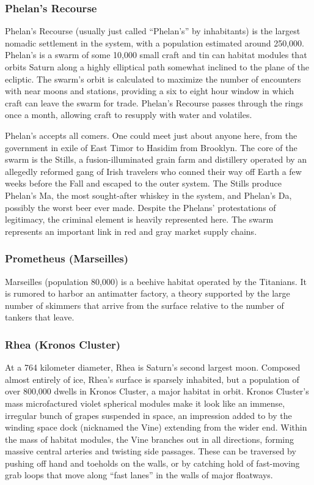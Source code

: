 \subsubsection{Phelan's Recourse}
\label{sec:phelans-recourse} 

Phelan's Recourse (usually just called “Phelan's” by inhabitants) is the largest nomadic settlement in the system, with a population estimated around 250,000. Phelan's is a swarm of some 10,000 small craft and tin can habitat modules that orbits Saturn along a highly elliptical path somewhat inclined to the plane of the ecliptic. The swarm's orbit is calculated to maximize the number of encounters with near moons and stations, providing a six to eight hour window in which craft can leave the swarm for trade. Phelan's Recourse passes through the rings once a month, allowing craft to resupply with water and volatiles. 

Phelan's accepts all comers. One could meet just about anyone here, from the government in exile of East Timor to Hasidim from Brooklyn. The core of the swarm is the Stills, a fusion-illuminated grain farm and distillery operated by an allegedly reformed gang of Irish travelers who conned their way off Earth a few weeks before the Fall and escaped to the outer system. The Stills produce Phelan's Ma, the most sought-after whiskey in the system, and Phelan's Da, possibly the worst beer ever made. Despite the Phelans' protestations of legitimacy, the criminal element is heavily represented here. The swarm represents an important link in red and gray market supply chains. 

\subsubsection{Prometheus (Marseilles)}
\label{sec:prom-mars} 

Marseilles (population 80,000) is a beehive habitat operated by the Titanians. It is rumored to harbor an antimatter factory, a theory supported by the large number of skimmers that arrive from the surface relative to the number of tankers that leave. 

\subsubsection{Rhea (Kronos Cluster)}
\label{sec:rhea-kronos-cluster} 

At a 764 kilometer diameter, Rhea is Saturn's second largest moon. Composed almost entirely of ice, Rhea's surface is sparsely inhabited, but a population of over 800,000 dwells in Kronos Cluster, a major habitat in orbit. Kronos Cluster's mass microfactured violet spherical modules make it look like an immense, irregular bunch of grapes suspended in space, an impression added to by the winding space dock (nicknamed the Vine) extending from the wider end. Within the mass of habitat modules, the Vine branches out in all directions, forming massive central arteries and twisting side passages. These can be traversed by pushing off hand and toeholds on the walls, or by catching hold of fast-moving grab loops that move along “fast lanes” in the walls of major floatways. 

